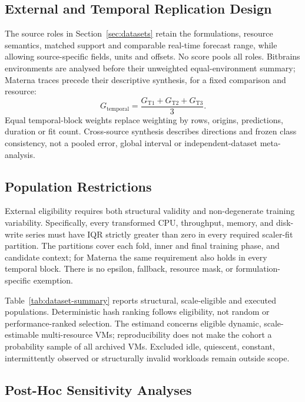 \documentclass[5p,twocolumn]{elsarticle}
\begin{document}
\subsection{External and Temporal Replication Design}
\label{sec:replication-design}

The source roles in Section~\ref{sec:datasets} retain the formulations,
resource semantics, matched support and comparable real-time forecast range,
while allowing source-specific fields, units and offsets. No score pools all
roles. Bitbrains environments are analysed before their unweighted
equal-environment summary; Materna traces precede their descriptive synthesis,
for a fixed comparison and resource:
\begin{equation}
  G_{\mathrm{temporal}}
  = \frac{G_{\mathrm{T1}}+G_{\mathrm{T2}}+G_{\mathrm{T3}}}{3}.
  \label{eq:temporal-synthesis}
\end{equation}
Equal temporal-block weights replace weighting by rows, origins, predictions,
duration or fit count. Cross-source synthesis describes directions and frozen
class consistency, not a pooled error, global interval or independent-dataset
meta-analysis.

\subsection{Population Restrictions}
\label{sec:population-restrictions}

External eligibility requires both structural validity and non-degenerate
training variability.  Specifically, every transformed CPU, throughput,
memory, and disk-write series must have IQR strictly greater than zero in every
required scaler-fit partition.  The partitions cover each fold, inner and final
training phase, and candidate context; for Materna the same requirement also
holds in every temporal block.  There is no epsilon, fallback, resource mask,
or formulation-specific exemption.

Table~\ref{tab:dataset-summary} reports structural, scale-eligible and executed
populations. Deterministic hash ranking follows eligibility, not random or
performance-ranked selection. The estimand concerns eligible dynamic,
scale-estimable multi-resource VMs; reproducibility does not make the cohort
a probability sample of all archived VMs. Excluded idle, quiescent, constant,
intermittently observed or structurally invalid workloads remain outside scope.

\subsection{Post-Hoc Sensitivity Analyses}
\label{sec:posthoc-controls}
\end{document}
